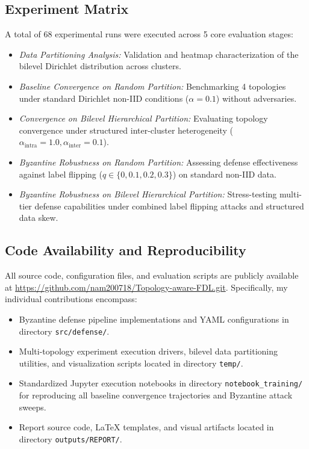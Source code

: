 \documentclass[11pt, a4paper]{article}
\begin{document}
\subsection{Experiment Matrix}
A total of 68 experimental runs were executed across 5 core evaluation stages:
\begin{itemize}
    \item \textit{Data Partitioning Analysis:} Validation and heatmap characterization of the bilevel Dirichlet distribution across clusters.
    \item \textit{Baseline Convergence on Random Partition:} Benchmarking 4 topologies under standard Dirichlet non-IID conditions ($\alpha=0.1$) without adversaries.
    \item \textit{Convergence on Bilevel Hierarchical Partition:} Evaluating topology convergence under structured inter-cluster heterogeneity ($\alpha_{\text{intra}}=1.0, \alpha_{\text{inter}}=0.1$).
    \item \textit{Byzantine Robustness on Random Partition:} Assessing defense effectiveness against label flipping ($q \in \{0, 0.1, 0.2, 0.3\}$) on standard non-IID data.
    \item \textit{Byzantine Robustness on Bilevel Hierarchical Partition:} Stress-testing multi-tier defense capabilities under combined label flipping attacks and structured data skew.
\end{itemize}

\subsection{Code Availability and Reproducibility}
All source code, configuration files, and evaluation scripts are publicly available at \url{https://github.com/nam200718/Topology-aware-FDL.git}. Specifically, my individual contributions encompass:
\begin{itemize}
    \item Byzantine defense pipeline implementations and YAML configurations in directory \texttt{src/defense/}.
    \item Multi-topology experiment execution drivers, bilevel data partitioning utilities, and visualization scripts located in directory \texttt{temp/}.
    \item Standardized Jupyter execution notebooks in directory \texttt{notebook\_training/} for reproducing all baseline convergence trajectories and Byzantine attack sweeps.
    \item Report source code, LaTeX templates, and visual artifacts located in directory \texttt{outputs/REPORT/}.
\end{itemize}
\end{document}
